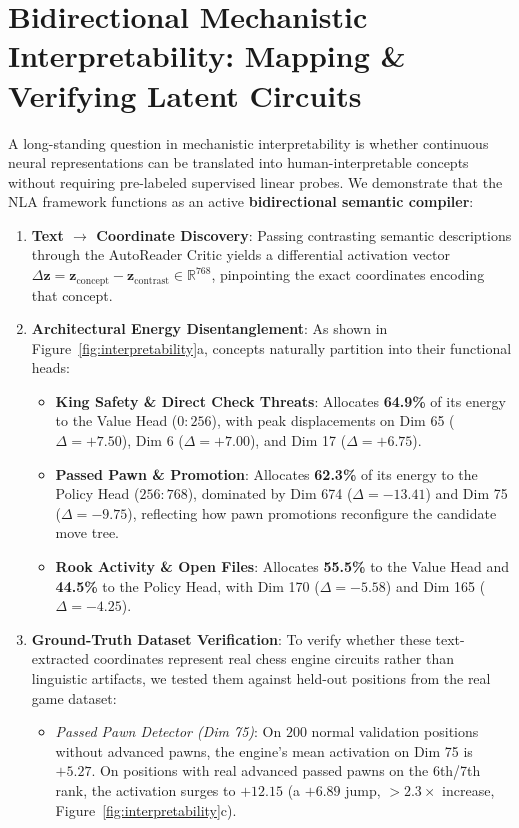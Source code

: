 \documentclass[10pt,twocolumn]{article}
\begin{document}
\section{Bidirectional Mechanistic Interpretability: Mapping \& Verifying Latent Circuits}
A long-standing question in mechanistic interpretability is whether continuous neural representations can be translated into human-interpretable concepts without requiring pre-labeled supervised linear probes. We demonstrate that the NLA framework functions as an active \textbf{bidirectional semantic compiler}:
\begin{enumerate}
    \item \textbf{Text $\to$ Coordinate Discovery}: Passing contrasting semantic descriptions through the AutoReader Critic yields a differential activation vector $\Delta \mathbf{z} = \mathbf{z}_{\text{concept}} - \mathbf{z}_{\text{contrast}} \in \mathbb{R}^{768}$, pinpointing the exact coordinates encoding that concept.
    \item \textbf{Architectural Energy Disentanglement}: As shown in Figure~\ref{fig:interpretability}a, concepts naturally partition into their functional heads:
    \begin{itemize}
        \item \textbf{King Safety \& Direct Check Threats}: Allocates \textbf{64.9\%} of its energy to the Value Head ($0:256$), with peak displacements on Dim 65 ($\Delta = +7.50$), Dim 6 ($\Delta = +7.00$), and Dim 17 ($\Delta = +6.75$).
        \item \textbf{Passed Pawn \& Promotion}: Allocates \textbf{62.3\%} of its energy to the Policy Head ($256:768$), dominated by Dim 674 ($\Delta = -13.41$) and Dim 75 ($\Delta = -9.75$), reflecting how pawn promotions reconfigure the candidate move tree.
        \item \textbf{Rook Activity \& Open Files}: Allocates \textbf{55.5\%} to the Value Head and \textbf{44.5\%} to the Policy Head, with Dim 170 ($\Delta = -5.58$) and Dim 165 ($\Delta = -4.25$).
    \end{itemize}
    \item \textbf{Ground-Truth Dataset Verification}: To verify whether these text-extracted coordinates represent real chess engine circuits rather than linguistic artifacts, we tested them against held-out positions from the real game dataset:
    \begin{itemize}
        \item \textit{Passed Pawn Detector (Dim 75)}: On $200$ normal validation positions without advanced pawns, the engine's mean activation on Dim 75 is $+5.27$. On positions with real advanced passed pawns on the 6th/7th rank, the activation surges to \textbf{$+12.15$} (a $+6.89$ jump, $> 2.3\times$ increase, Figure~\ref{fig:interpretability}c).

\end{itemize}
\end{enumerate}
\end{document}
